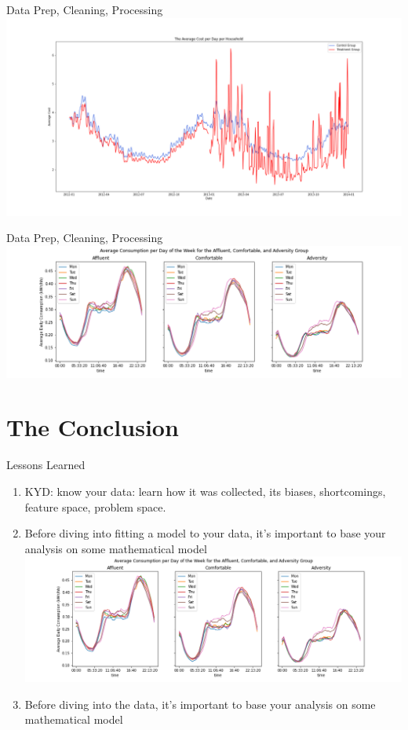 \documentclass{beamer}
\begin{document}
\begin{frame}{Data Prep, Cleaning, Processing}
  \centering
  \includegraphics[width=1\textwidth]{images/avg-cost-per-day.png}
\end{frame}

\begin{frame}{Data Prep, Cleaning, Processing}
  \centering
  \includegraphics[width=1.1\textwidth]{images/dow-socio.png}
\end{frame}

\section{The Conclusion}

\begin{frame}{Lessons Learned}
  \begin{enumerate}
    \item<+-> KYD: know your data: learn how it was collected, its biases, shortcomings, feature space, problem space.
    \item<+-> Before diving into fitting a model to your data, it's important to base your analysis on some mathematical model
    \centering
    \includegraphics[width=1\textwidth]{images/dow-socio.png}
    \item<+-> Before diving into the data, it's important to base your analysis on some mathematical model
  \end{enumerate}
\end{frame}
\end{document}

